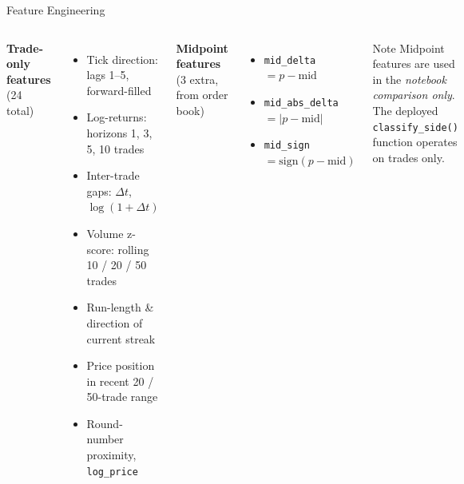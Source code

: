 \documentclass[aspectratio=169,10pt]{beamer}
\newcommand{\code}[1]{\texttt{\small #1}}
\begin{document}
\begin{frame}{Feature Engineering}
  \begin{columns}[T]
    \textbf{Trade-only features} (24 total)
    \begin{itemize}\setlength\itemsep{1pt}
      \item Tick direction: lags 1–5, forward-filled
      \item Log-returns: horizons 1, 3, 5, 10 trades
      \item Inter-trade gaps: $\Delta t$, $\log(1{+}\Delta t)$
      \item Volume z-score: rolling 10 / 20 / 50 trades
      \item Run-length \& direction of current streak
      \item Price position in recent 20 / 50-trade range
      \item Round-number proximity, \code{log\_price}
    \end{itemize}

    \textbf{Midpoint features} (3 extra, from order book)
    \begin{itemize}
      \item \code{mid\_delta}     $= p - \text{mid}$
      \item \code{mid\_abs\_delta} $= |p - \text{mid}|$
      \item \code{mid\_sign}      $= \text{sign}(p - \text{mid})$
    \end{itemize}

    \medskip
    \begin{block}{Note}
      Midpoint features are used in the \emph{notebook comparison only}.
      The deployed \code{classify\_side()} function operates on trades only.
    \end{block}
  \end{columns}
\end{frame}
\end{document}
